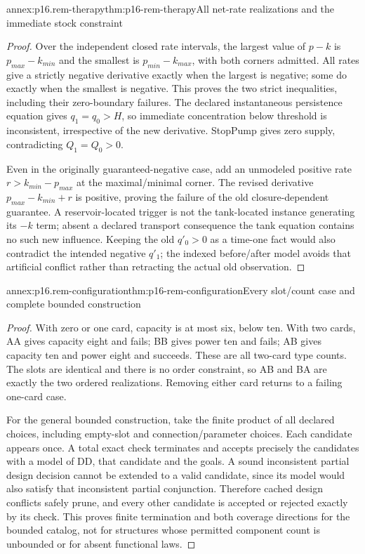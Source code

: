 \begin{annexitem}{annex:p16.rem-therapy}{thm:p16-rem-therapy}{All net-rate realizations and the immediate stock constraint}
\begin{proof}
Over the independent closed rate intervals, the largest value of \(p-k\)
is \(p_{max}-k_{min}\) and the smallest is \(p_{min}-k_{max}\),
with both corners admitted. All rates give a strictly negative derivative
exactly when the largest is negative; some do exactly when the smallest
is negative. This proves the two strict inequalities, including their
zero-boundary failures. The declared instantaneous persistence equation
gives \(q_1=q_0>H\), so immediate concentration below threshold is
inconsistent, irrespective of the new derivative. StopPump gives zero
supply, contradicting \(Q_1=Q_0>0\).

Even in the originally guaranteed-negative case, add an unmodeled positive
rate \(r>k_{min}-p_{max}\) at the maximal/minimal corner. The revised
derivative \(p_{max}-k_{min}+r\) is positive, proving the failure of
the old closure-dependent guarantee. A reservoir-located trigger is not
the tank-located instance generating its \(-k\) term; absent a declared
transport consequence the tank equation contains no such new influence.
Keeping the old \(q'_0>0\) as a time-one fact would also contradict
the intended negative \(q'_1\); the indexed before/after model avoids
that artificial conflict rather than retracting the actual old observation.
\end{proof}
\end{annexitem}

\begin{annexitem}{annex:p16.rem-configuration}{thm:p16-rem-configuration}{Every slot/count case and complete bounded construction}
\begin{proof}
With zero or one card, capacity is at most six, below ten. With two cards,
AA gives capacity eight and fails; BB gives power ten and fails; AB gives
capacity ten and power eight and succeeds. These are all two-card type
counts. The slots are identical and there is no order constraint, so AB
and BA are exactly the two ordered realizations. Removing either card
returns to a failing one-card case.

For the general bounded construction, take the finite product of all declared
choices, including empty-slot and connection/parameter choices. Each candidate
appears once. A total exact check terminates and accepts precisely the
candidates with a model of DD, that candidate and the goals. A sound
inconsistent partial design decision cannot be extended to a valid candidate,
since its model would also satisfy that inconsistent partial conjunction.
Therefore cached design conflicts safely prune, and every other candidate
is accepted or rejected exactly by its check. This proves finite termination
and both coverage directions for the bounded catalog, not for structures
whose permitted component count is unbounded or for absent functional laws.
\end{proof}
\end{annexitem}

